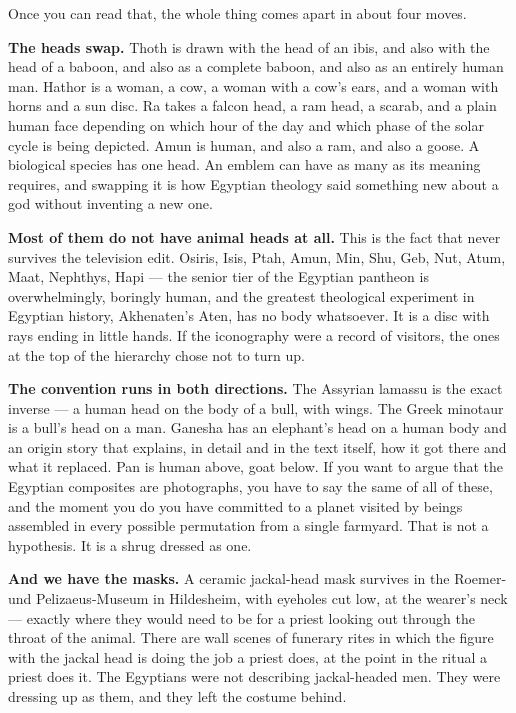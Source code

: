 Once you can read that, the whole thing comes apart in about four moves.

\textbf{The heads swap.} Thoth is drawn with the head of an ibis, and also with the head of a
baboon, and also as a complete baboon, and also as an entirely human man. Hathor is a woman, a
cow, a woman with a cow's ears, and a woman with horns and a sun disc. Ra takes a falcon head, a
ram head, a scarab, and a plain human face depending on which hour of the day and which phase of
the solar cycle is being depicted. Amun is human, and also a ram, and also a goose. A biological
species has one head. An emblem can have as many as its meaning requires, and swapping it is how
Egyptian theology said something new about a god without inventing a new one.

\textbf{Most of them do not have animal heads at all.} This is the fact that never survives the
television edit. Osiris, Isis, Ptah, Amun, Min, Shu, Geb, Nut, Atum, Maat, Nephthys, Hapi ---
the senior tier of the Egyptian pantheon is overwhelmingly, boringly human, and the greatest
theological experiment in Egyptian history, Akhenaten's Aten, has no body whatsoever. It is a
disc with rays ending in little hands. If the iconography were a record of visitors, the ones at
the top of the hierarchy chose not to turn up.

\textbf{The convention runs in both directions.} The Assyrian lamassu is the exact inverse ---
a human head on the body of a bull, with wings. The Greek minotaur is a bull's head on a man.
Ganesha has an elephant's head on a human body and an origin story that explains, in detail and
in the text itself, how it got there and what it replaced. Pan is human above, goat below.
If you want to argue that the Egyptian composites are photographs, you have to say the same of
all of these, and the moment you do you have committed to a planet visited by beings assembled
in every possible permutation from a single farmyard. That is not a hypothesis. It is a shrug
dressed as one.

\textbf{And we have the masks.} A ceramic jackal-head mask survives in the Roemer- und
Pelizaeus-Museum in Hildesheim, with eyeholes cut low, at the wearer's neck --- exactly where
they would need to be for a priest looking out through the throat of the animal. There are
wall scenes of funerary rites in which the figure with the jackal head is doing the job a
priest does, at the point in the ritual a priest does it. The Egyptians were not describing
jackal-headed men. They were dressing up as them, and they left the costume behind.

